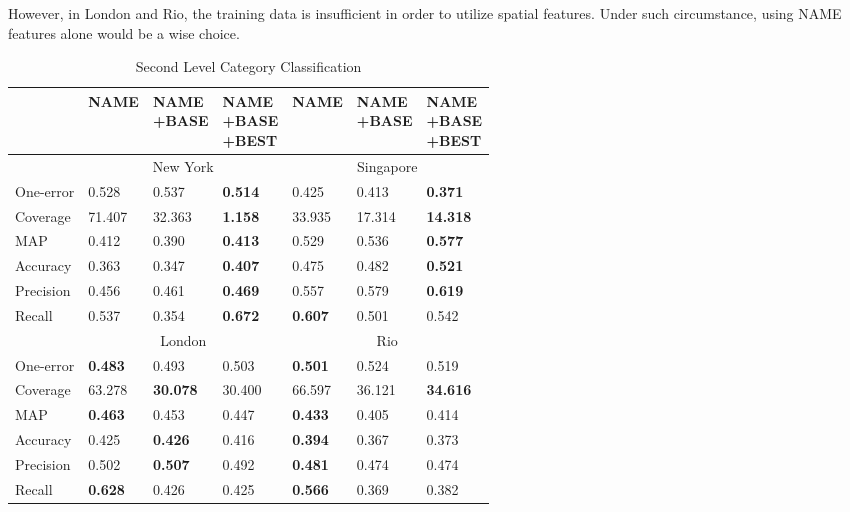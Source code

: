However, in London and Rio, the training data is insufficient
in order to utilize spatial features. Under such circumstance,
using NAME features alone would be a wise choice.

\begin{table}[ht]
\caption{Second Level Category Classification}
\begin{tabular}{l|p{1.5cm}p{1.5cm}p{1.5cm}|p{1.5cm}p{1.5cm}p{1.5cm}}
\hline

& NAME & \tabincell{c}{NAME\\+BASE} &  \tabincell{c}{NAME\\+BASE\\+BEST} & NAME & \tabincell{c}{NAME\\+BASE} &  \tabincell{c}{NAME\\+BASE\\+BEST}\\
\hline
 & \multicolumn{3}{|c}{New York} & \multicolumn{3}{|c}{Singapore} \\
\hline
One-error & 0.528  & 0.537  & \textbf{0.514}  & 0.425  & 0.413  & \textbf{0.371} \\
Coverage & 71.407  & 32.363  & \textbf{1.158}  & 33.935  & 17.314  & \textbf{14.318} \\
MAP & 0.412  & 0.390  & \textbf{0.413}  & 0.529  & 0.536  & \textbf{0.577} \\
Accuracy & 0.363  & 0.347  & \textbf{0.407}  & 0.475  & 0.482  & \textbf{0.521} \\
Precision & 0.456  & 0.461  & \textbf{0.469}  & 0.557  & 0.579  & \textbf{0.619} \\
Recall & 0.537  & 0.354  & \textbf{0.672}  & \textbf{0.607}  & 0.501  & 0.542 \\

\hline
 & \multicolumn{3}{|c}{London} & \multicolumn{3}{|c}{Rio} \\
\hline
One-error & \textbf{0.483}  & 0.493  & 0.503  & \textbf{0.501}  & 0.524  & 0.519 \\
Coverage & 63.278  & \textbf{30.078}  & 30.400  & 66.597  & 36.121  & \textbf{34.616} \\
MAP & \textbf{0.463}  & 0.453  & 0.447  & \textbf{0.433}  & 0.405  & 0.414 \\
Accuracy & 0.425  & \textbf{0.426}  & 0.416  & \textbf{0.394}  & 0.367  & 0.373 \\
Precision & 0.502  & \textbf{0.507}  & 0.492  & \textbf{0.481}  & 0.474  & 0.474 \\
Recall & \textbf{0.628}  & 0.426  & 0.425  & \textbf{0.566}  & 0.369  & 0.382 \\

\hline
\end{tabular}
\label{tab:L2Result}
\end{table}







